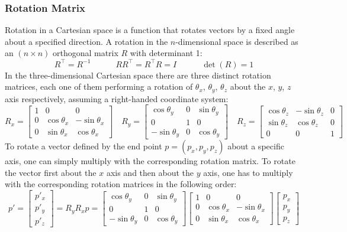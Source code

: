 \subsubsection*{Rotation Matrix}
Rotation in a Cartesian space is a function that rotates vectors by a fixed angle about a specified direction. A rotation in the $n$-dimensional space is described as an $(n\times n)$ orthogonal matrix $R$ with determinant 1:
\[
R^\top = R^{-1} \quad \quad  \quad
RR^\top = R^\top R = I \quad \quad  \quad
\det(R) = 1
\]
In the three-dimensional Cartesian space there are three distinct rotation matrices, each one of them performing a rotation of $\theta_x$, $\theta_y$, $\theta_z$ about the $x$, $y$, $z$ axis respectively, assuming a right-handed coordinate system:
\[
R_x = 
\begin{bmatrix}
1 & 0 & 0 \\
0 & \cos\theta_x & -\sin\theta_x \\
0 & \sin\theta_x & \cos\theta_x
\end{bmatrix}
\quad
R_y = 
\begin{bmatrix}
\cos\theta_y & 0 & \sin\theta_y \\
0 & 1 & 0\\
-\sin\theta_y & 0 & \cos\theta_y
\end{bmatrix}
\quad
R_z = 
\begin{bmatrix}
\cos\theta_z & -\sin\theta_z & 0 \\
\sin\theta_z & \cos\theta_z & 0 \\
0 & 0 & 1 
\end{bmatrix}
\]
To rotate a vector defined by the end point $p=(p_x,p_y,p_z)$ about a specific axis, one can simply multiply with the corresponding rotation matrix. To rotate the vector first about the $x$ axis and then about the $y$ axis, one has to multiply with the corresponding rotation matrices in the following order:
\[
p' = 
\begin{bmatrix}
p'_x\\
p'_y\\
p'_z
\end{bmatrix}
=
R_yR_xp = 
\begin{bmatrix}
\cos\theta_y & 0 & \sin\theta_y \\
0 & 1 & 0\\
-\sin\theta_y & 0 & \cos\theta_y
\end{bmatrix}
\begin{bmatrix}
1 & 0 & 0 \\
0 & \cos\theta_x & -\sin\theta_x \\
0 & \sin\theta_x & \cos\theta_x
\end{bmatrix}
\begin{bmatrix}
p_x\\
p_y\\
p_z
\end{bmatrix}
\]
